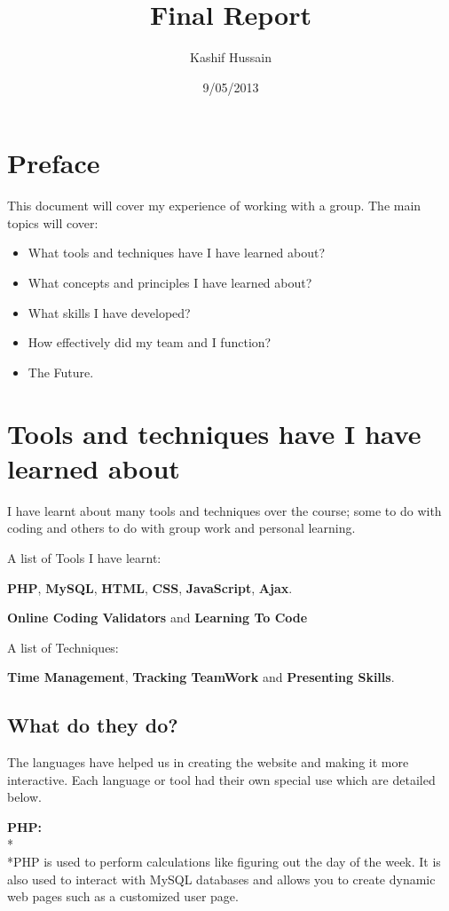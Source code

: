 \documentclass[12pt,a4paper]{article}
\title{Final Report}
\author{Kashif Hussain}
\date{9/05/2013}
\begin{document}
\maketitle
\tableofcontents

\newpage

\section{Preface}
This document will cover my experience of working with a group.
The main topics will cover:

\begin{itemize}

\item  What tools and techniques have I have learned about?
\item  What concepts and principles I have learned about?
\item  What skills I have developed?
\item  How effectively did my team and I function?
\item  The Future.

\end{itemize}

\newpage
\section{Tools and techniques have I have learned about}
I have learnt about many tools and techniques over the course; some to do with coding 
and others to do with group work and personal learning.

A list of Tools I have learnt:
	
\textbf{PHP}, \textbf{MySQL}, \textbf{HTML}, \textbf{CSS}, \textbf{JavaScript},
\textbf{Ajax}.

\textbf{Online Coding Validators}\cite{W3 Validator} and \textbf{Learning To Code}\cite{W3 Schools}

A list of Techniques:

\textbf{Time Management}, 
\textbf{Tracking TeamWork} and  \textbf{Presenting Skills}.

\subsection{What do they do?}
The languages have helped us in creating the website and making it more interactive.
Each language or tool had their own special use which are detailed below.

\textbf{PHP:}   
		\\*\\*PHP is used to perform calculations like figuring out the day of the week.
                It is also used to interact with MySQL databases and allows you to create dynamic web pages
                such as a customized user page.
\end{document}
